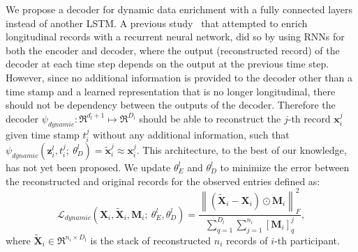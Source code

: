 
We propose a decoder for dynamic data enrichment with a fully connected layers instead of another LSTM. A previous study~\cite{srivastava2015unsupervised} that attempted to enrich longitudinal records with a recurrent neural network, did so by using RNNs for both the encoder and decoder, where the output (reconstructed record) of the decoder at each time step depends on the output at the previous time step. However, since no additional information is provided to the decoder other than a time stamp and a learned representation that is no longer longitudinal, there should not be dependency between the outputs of the decoder. Therefore the decoder $\psi_{dynamic}:\Re^{d_l + 1} \mapsto \Re^{D_l}$ should be able to reconstruct the $j$-th record $\mathbf{x}_i^j$ given time stamp $t_i^j$ without any additional information, such that $\psi_{dynamic}(\mathbf{z}_i^l, t^j_i;\ \theta^l_{D}) = \tilde{\mathbf{x}}_i^j \approx \mathbf{x}_i^j$. This architecture, to the best of our knowledge, has not yet been proposed. We update $\theta^l_{E}$ and $\theta^l_{D}$ to minimize the error between the reconstructed and original records for the observed entries defined as: 
\begin{equation}
    \mathcal{L}_{dynamic}(\mathbf{X}_i, \tilde{\mathbf{X}}_i, \mathbf{M}_i;\ 
    \theta^l_{E}, \theta^l_{D}) = \frac{\left\| (\tilde{\mathbf{X}}_i
- \mathbf{X}_i) \odot \mathbf{M}_i
\right\|_F^2}{\sum_{q=1}^{D_l}\sum_{j=1}^{n_i}[\mathbf{M}_i]^j_q},
\end{equation}
where $\tilde{\mathbf{X}}_i \in \Re^{n_i \times D_l}$ is the stack of reconstructed $n_i$ records of $i$-th participant. 



